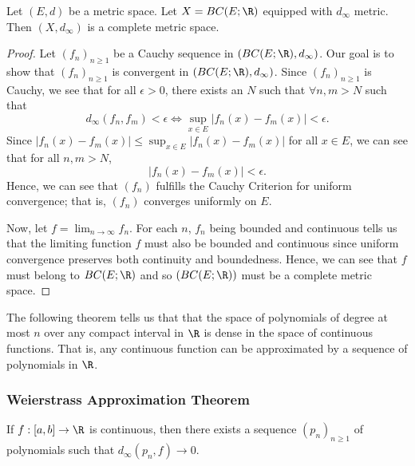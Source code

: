 \begin{theorem}[Rudin 7.15]
    Let \( (E,d) \) be a metric space. Let \( X = BC(E;\R) \) equipped with \( {d}_{\infty } \) metric. Then \( (X, {d}_{\infty }) \) is a complete metric space. 
\end{theorem}
\begin{proof}
    Let \( ({f}_{n})_{n \geq 1}   \) be a Cauchy sequence in \( (BC(E;\R), {d}_{\infty }) \). Our goal is to show that \( ({f}_{n})_{n \geq 1} \) is convergent in \( (BC(E;\R), {d}_{\infty}) \). Since \( ({f}_{n})_{n \geq 1} \) is Cauchy, we see that for all \( \epsilon > 0  \), there exists an \( N  \) such that \( \forall n,m > N  \) such that 
    \[  {d}_{\infty } ({f}_{n}, {f}_{m}) < \epsilon \iff \sup_{x \in E } | {f}_{n}(x) - {f}_{m}(x) |  < \epsilon. \]
    Since \( | {f}_{n}(x) - {f}_{m}(x) |  \leq \sup_{x \in E } | {f}_{n}(x) - {f}_{m}(x) |   \) for all \( x \in E  \), we can see that for all \( n,m > N  \), \[  | {f}_{n}(x) - {f}_{m}(x)  |  < \epsilon. \] 
    Hence, we can see that \( ({f}_{n}) \) fulfills the Cauchy Criterion for uniform convergence; that is, \( ({f}_{n}) \) converges uniformly on \( E  \).

    Now, let \( f = \lim_{ n \to \infty  }  {f}_{n} \). For each \( n  \), \( {f}_{n} \) being bounded and continuous tells us that the limiting function \( f  \) must also be bounded and continuous since uniform convergence preserves both continuity and boundedness. Hence, we can see that \( f  \) must belong to \( BC(E; \R) \) and so \( (BC(E;\R)) \) must be a complete metric space.
\end{proof}

The following theorem tells us that that the space of polynomials of degree at most \( n \) over any compact interval in \( \R  \) is dense in the space of continuous functions. That is, any continuous function can be approximated by a sequence of polynomials in \( \R  \).

\subsubsection{Weierstrass Approximation Theorem}\label{Weierstrass Approximation Theorem}

\begin{theorem}[Rudin 7.26]\label{Rudin 7.26}
    If \( f: [a,b] \to \R  \) is continuous, then there exists a sequence \(({p}_{n})_{n \geq 1} \) of polynomials such that \( {d}_{\infty }({p}_{n}, f) \to 0  \).
\end{theorem}

